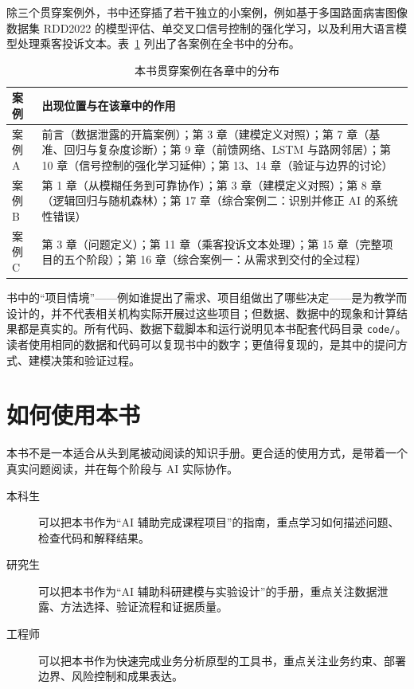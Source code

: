 除三个贯穿案例外，书中还穿插了若干独立的小案例，例如基于多国路面病害图像数据集 RDD2022 的模型评估、单交叉口信号控制的强化学习，以及利用大语言模型处理乘客投诉文本。表~\ref{tab:running_cases} 列出了各案例在全书中的分布。

\begin{table}[H]
\centering
\caption{本书贯穿案例在各章中的分布}
\label{tab:running_cases}
\begin{tabular}{p{2.2cm}p{11.2cm}}
\toprule
案例 & 出现位置与在该章中的作用 \\
\midrule
案例 A & 前言（数据泄露的开篇案例）；第 3 章（建模定义对照）；第 7 章（基准、回归与复杂度诊断）；第 9 章（前馈网络、LSTM 与路网邻居）；第 10 章（信号控制的强化学习延伸）；第 13、14 章（验证与边界的讨论） \\
案例 B & 第 1 章（从模糊任务到可靠协作）；第 3 章（建模定义对照）；第 8 章（逻辑回归与随机森林）；第 17 章（综合案例二：识别并修正 AI 的系统性错误） \\
案例 C & 第 3 章（问题定义）；第 11 章（乘客投诉文本处理）；第 15 章（完整项目的五个阶段）；第 16 章（综合案例一：从需求到交付的全过程） \\
\bottomrule
\end{tabular}
\end{table}

书中的“项目情境”——例如谁提出了需求、项目组做出了哪些决定——是为教学而设计的，并不代表相关机构实际开展过这些项目；但数据、数据中的现象和计算结果都是真实的。所有代码、数据下载脚本和运行说明见本书配套代码目录 \texttt{code/}。读者使用相同的数据和代码可以复现书中的数字；更值得复现的，是其中的提问方式、建模决策和验证过程。

\section*{如何使用本书}

本书不是一本适合从头到尾被动阅读的知识手册。更合适的使用方式，是带着一个真实问题阅读，并在每个阶段与 AI 实际协作。

\begin{description}
  \item[本科生] 可以把本书作为“AI 辅助完成课程项目”的指南，重点学习如何描述问题、检查代码和解释结果。
  \item[研究生] 可以把本书作为“AI 辅助科研建模与实验设计”的手册，重点关注数据泄露、方法选择、验证流程和证据质量。
  \item[工程师] 可以把本书作为快速完成业务分析原型的工具书，重点关注业务约束、部署边界、风险控制和成果表达。
\end{description}

